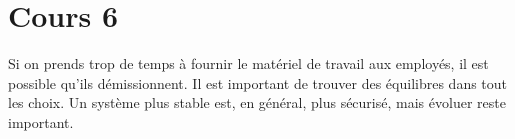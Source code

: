 \section{Cours 6}
Si on prends trop de temps \`a fournir le mat\'eriel de travail aux employ\'es, il est possible qu'ils d\'emissionnent.
Il est important de trouver des \'equilibres dans tout les choix. Un syst\`eme plus stable est, en g\'en\'eral, plus
s\'ecuris\'e, mais \'evoluer reste important.
